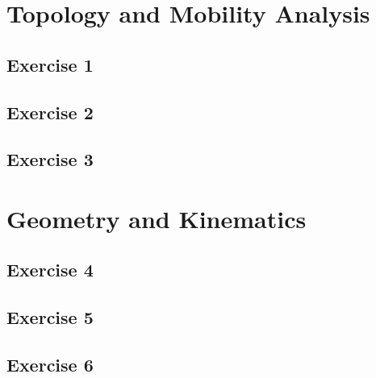 \showchapterboxtrue 
{}


\section{Topology and Mobility Analysis}
\subsection*{Exercise 1}
\lipsum[1]

\begin{solution}
    \lipsum[1]
\end{solution}

\subsection*{Exercise 2}
\lipsum[1]

\begin{solution}
    \lipsum[4]
\end{solution}

\subsection*{Exercise 3}
\lipsum[5]

\begin{solution}
    \lipsum[6]
\end{solution}

\section{Geometry and Kinematics}
\subsection{Exercise 4}
\lipsum[7]

\begin{solution}
    \lipsum[8]
\end{solution}

\subsection{Exercise 5}
\lipsum[9]

\begin{solution}
    \lipsum[10]
\end{solution}

\subsection{Exercise 6}
\lipsum[11]

